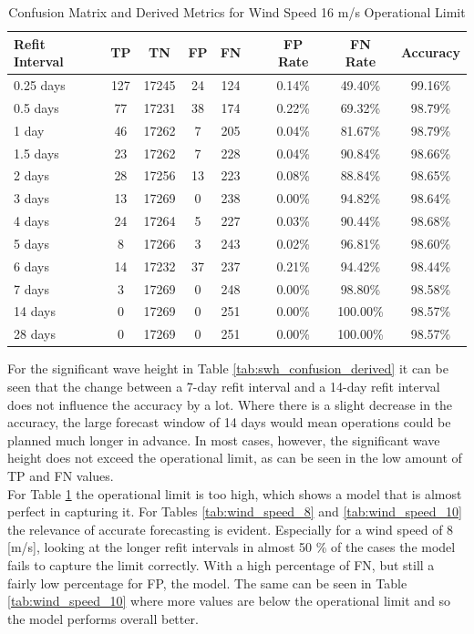 \begin{table}[ht!]
    \centering
    \caption{Confusion Matrix and Derived Metrics for Wind Speed 16 m/s Operational Limit}
    \label{tab:wind_speed_16}
    \begin{tabular}{|l|c|c|c|c|c|c|c|c|}
        \hline
        \textbf{Refit Interval} & \textbf{TP} & \textbf{TN} & \textbf{FP} & \textbf{FN} && \textbf{FP Rate} & \textbf{FN Rate} & \textbf{Accuracy} \\
        \hline
        0.25 days & 127 & 17245 & 24  & 124 && 0.14\%  & 49.40\% & 99.16\% \\
        0.5 days  & 77  & 17231 & 38  & 174 && 0.22\%  & 69.32\% & 98.79\% \\
        1 day     & 46  & 17262 & 7   & 205 && 0.04\%  & 81.67\% & 98.79\% \\
        1.5 days  & 23  & 17262 & 7   & 228 && 0.04\%  & 90.84\% & 98.66\% \\
        2 days    & 28  & 17256 & 13  & 223 && 0.08\%  & 88.84\% & 98.65\% \\
        3 days    & 13  & 17269 & 0   & 238 && 0.00\%  & 94.82\% & 98.64\% \\
        4 days    & 24  & 17264 & 5   & 227 && 0.03\%  & 90.44\% & 98.68\% \\
        5 days    & 8   & 17266 & 3   & 243 && 0.02\%  & 96.81\% & 98.60\% \\
        6 days    & 14  & 17232 & 37  & 237 && 0.21\%  & 94.42\% & 98.44\% \\
        7 days    & 3   & 17269 & 0   & 248 && 0.00\%  & 98.80\% & 98.58\% \\
        14 days   & 0   & 17269 & 0   & 251 && 0.00\%  & 100.00\% & 98.57\% \\
        28 days   & 0   & 17269 & 0   & 251 && 0.00\%  & 100.00\% & 98.57\% \\
        \hline
    \end{tabular}
\end{table}

\noindent For the significant wave height in Table \ref{tab:swh_confusion_derived} it can be seen that the change between a 7-day refit interval and a 14-day refit interval does not influence the accuracy by a lot. Where there is a slight decrease in the accuracy, the large forecast window of 14 days would mean operations could be planned much longer in advance. In most cases, however, the significant wave height does not exceed the operational limit, as can be seen in the low amount of TP and FN values.\\

\noindent For Table \ref{tab:wind_speed_16} the operational limit is too high, which shows a model that is almost perfect in capturing it. For Tables \ref{tab:wind_speed_8} and \ref{tab:wind_speed_10} the relevance of accurate forecasting is evident. Especially for a wind speed of 8 [m/s], looking at the longer refit intervals in almost 50 \% of the cases the model fails to capture the limit correctly. With a high percentage of FN, but still a fairly low percentage for FP, the model. The same can be seen in Table \ref{tab:wind_speed_10} where more values are below the operational limit and so the model performs overall better.  